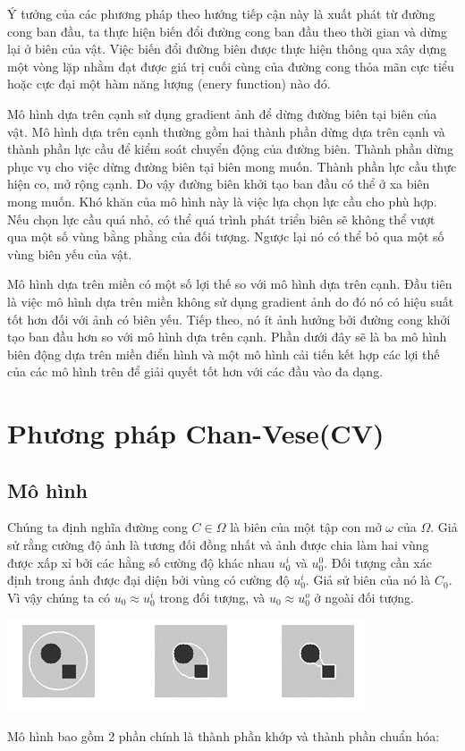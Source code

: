 \documentclass[12pt, oneside, a4]{book}
\begin{document}
Ý tưởng của các phương pháp theo hướng tiếp cận này là xuất phát từ đường cong ban đầu, ta thực hiện biến đổi đường cong ban đầu theo thời gian  và dừng lại ở biên của vật. Việc biến đổi đường biên được thực hiện thông qua xây dựng một vòng lặp nhằm đạt được giá trị cuối cùng của đường cong thỏa mãn cực tiểu hoặc cực đại một hàm năng lượng (enery function) nào đó.

Mô hình dựa trên cạnh sử dụng gradient ảnh để dừng đường biên tại biên của vật. Mô hình dựa trên cạnh thường gồm hai thành phần dừng dựa trên cạnh  và thành phần lực cầu để kiểm soát chuyển động của đường biên. Thành phần dừng phục vụ cho việc dừng đường biên tại biên mong muốn. Thành phần lực cầu thực hiện co, mở rộng cạnh. Do vậy đường biên khởi tạo ban đầu có thể ở xa biên mong muốn. Khó khăn của mô hình này là việc lựa chọn lực cầu cho phù hợp. Nếu chọn lực cầu quá nhỏ, có thể quá trình phát triển biên sẽ không thể vượt qua một số vùng bằng phằng của đối tượng. Ngược lại nó có thể bỏ qua một số vùng biên yếu của vật.

Mô hình dựa trên miền có một số lợi thế so với mô hình dựa trên cạnh. Đầu tiên là việc mô hình dựa trên miền không sử dụng gradient ảnh do đó nó có hiệu suất tốt hơn đối với ảnh có biên yếu. Tiếp theo, nó ít ảnh hưởng bởi đường cong khởi tạo ban đầu hơn so với mô hình dựa trên cạnh.  Phần dưới đây sẽ là ba mô hình biên động dựa trên miền điển hình và một mô hình cải tiến kết hợp các lợi thế của các mô hình trên để giải quyết tốt hơn với các đầu vào đa dạng.
\section{Phương pháp Chan-Vese(CV)}


\subsection{Mô hình}
Chúng ta định nghĩa đường cong $C\in \Omega$ là biên của một tập con mở $\omega$ của $\Omega$. Giả sử rằng cường độ ảnh là tương đối đồng nhất và ảnh được chia làm hai vùng được xấp xỉ bởi các hằng số cường độ khác nhau $u_0^i$ và $u_0^0$. Đối tượng cần xác định trong ảnh được đại diện bởi vùng có cường độ $u_0^i$. Giả sử biên của nó là $C_0$. Vì vậy chúng ta có $u_0\approx u_0^i$ trong đối tượng, và $u_0\approx u_0^o$ ở ngoài đối tượng.
\begin{center}
\includegraphics[scale=1]{figure/ytuong.png}
\end{center}
Mô hình bao gồm 2 phần chính là thành phần khớp và thành phần chuẩn hóa: 
\end{document}
